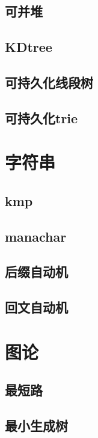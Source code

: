 \documentclass[UTF8,a4paper]{ctexart}
\begin{document}
\subsection{可并堆}

\subsection{KDtree}

\subsection{可持久化线段树}

\subsection{可持久化trie}

\section{字符串}

\subsection{kmp}

\subsection{manachar}



\subsection{后缀自动机}

\subsection{回文自动机}

\section{图论}

\subsection{最短路}

\subsection{最小生成树}
\end{document}
